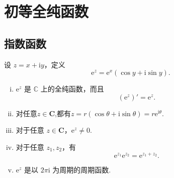 \documentclass[../../main.tex]{subfiles}
\begin{document}
\section{初等全纯函数}

\subsection{指数函数}

\begin{definition}[指数函数]
设 \( z = x + \mathrm{i}y \)，定义
\[
\mathrm{e}^z = \mathrm{e}^x (\cos y + \mathrm{i}\sin y).
\]
\end{definition}

\begin{proposition}\label{proposition:指数函数的性质}
\begin{enumerate}[(i)]
\item \( \mathrm{e}^z \) 是 \( \mathbb{C} \) 上的全纯函数，而且
\[
(\mathrm{e}^z)' = \mathrm{e}^z.
\]

\item 对任意\( z \in \mathbf{C} \),都有\( z = r(\cos\theta + \mathrm{i}\sin\theta)= r\mathrm{e}^{\mathrm{i}\theta} \).

\item 对于任意 \( z \in \mathbf{C} \)，\( \mathrm{e}^z \neq 0 \). 

\item 对于任意 \( z_1, z_2 \)，有
\[
\mathrm{e}^{z_1} \mathrm{e}^{z_2} = \mathrm{e}^{z_1 + z_2}.
\]

\item \( \mathrm{e}^z \) 是以 \( 2\pi\mathrm{i} \) 为周期的周期函数.
\end{enumerate}
\end{proposition}
\end{document}
